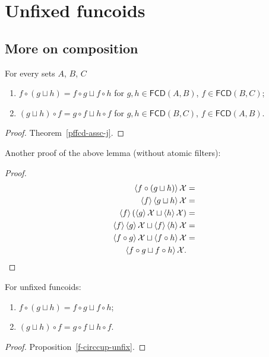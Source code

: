 \chapter{Unfixed funcoids}

\section{More on composition}

\begin{lem}
For every sets $A$, $B$, $C$
\begin{enumerate}
\item $f\circ(g\sqcup h)=f\circ g\sqcup f\circ h$ for $g,h\in\mathsf{FCD}(A,B)$,
$f\in\mathsf{FCD}(B,C)$;
\item $(g\sqcup h)\circ f=g\circ f\sqcup h\circ f$ for
$g,h\in\mathsf{FCD}(B,C)$,
$f\in\mathsf{FCD}(A,B)$.
\end{enumerate}
\end{lem}

\begin{proof}
Theorem~\ref{pffcd-assc-j}.
\end{proof}

Another proof of the above lemma (without atomic filters):

\begin{proof}
~
\begin{align*}
\left\langle f\circ(g\sqcup h)\right\rangle\mathcal{X} & =\\
\left\langle f\right\rangle\left\langle g\sqcup h\right\rangle\mathcal{X} & =\\
\left\langle f\right\rangle(\left\langle g\right\rangle\mathcal{X}\sqcup\left\langle h\right\rangle\mathcal{X}) & =\\
\left\langle f\right\rangle\left\langle g\right\rangle\mathcal{X}\sqcup\left\langle f\right\rangle\left\langle h\right\rangle\mathcal{X} & =\\
\left\langle f\circ g\right\rangle\mathcal{X}\sqcup\left\langle f\circ h\right\rangle\mathcal{X} & =\\
\left\langle f\circ g\sqcup f\circ h\right\rangle\mathcal{X}.
\end{align*}
\end{proof}

\begin{thm}
For unfixed funcoids:
\begin{enumerate}
\item $f\circ(g\sqcup h)=f\circ g\sqcup f\circ h$;
\item $(g\sqcup h)\circ f=g\circ f\sqcup h\circ f$.
\end{enumerate}
\end{thm}

\begin{proof}
Proposition~\ref{f-circcup-unfix}.
\end{proof}


